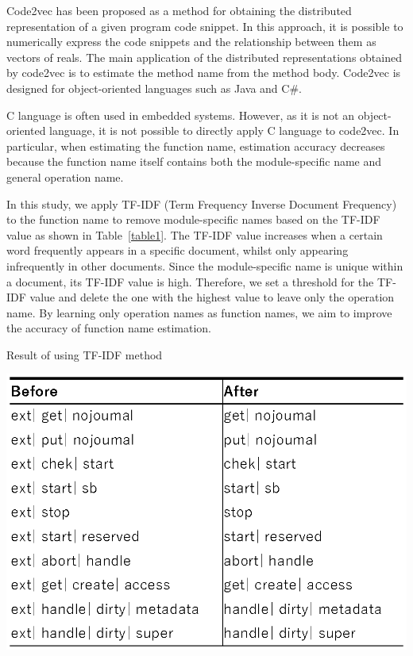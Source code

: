 \documentclass[JIP]{apris}
\begin{document}
Code2vec\cite{alon2019code2vec} has been proposed as a method for obtaining the distributed representation of a given program code snippet. In this approach, it is possible to numerically express the code snippets and the relationship between them as vectors of reals. The main application of the distributed representations obtained by code2vec is to estimate the method name from the method body. Code2vec is designed for object-oriented languages such as Java and C\#. 

C language is often used in embedded systems. However, as it is not an object-oriented language, it is not possible to directly apply C language to code2vec. In particular, when estimating the function name, estimation accuracy decreases because the function name itself contains both the module-specific name and general operation name.

In this study, we apply TF-IDF (Term Frequency Inverse Document Frequency)\cite{ramos2003using} to the function name to remove module-specific names based on the TF-IDF value as shown in Table~\ref{table1}. The TF-IDF value increases when a certain word frequently appears in a specific document, whilst only appearing infrequently in other documents. Since the module-specific name is unique within a document, its TF-IDF value is high. Therefore, we set a threshold for the TF-IDF value and delete the one with the highest value to leave only the operation name. By learning only operation names as function names, we aim to improve the accuracy of function name estimation. 

\begin{table}[t]
 \centering
 \caption{Result of using TF-IDF method}
 \includegraphics[width=1.0\hsize]{image/TF-IDF.eps} 
 \label{table1} 
\end{table}
\end{document}

